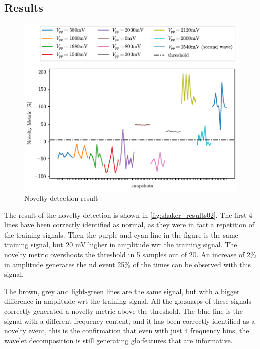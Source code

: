 \subsection{Results}
\begin{figure}
    \centering
    \includegraphics{Images/shaker/Test02.pdf}
    \caption{Novelty detection result}
    \label{fig:shaker_results02}
\end{figure}
The result of the novelty detection is shown in \autoref{fig:shaker_results02}. The first 4 lines have been correctly identified as normal, as they were in fact a repetition of the training signals.
Then the purple and cyan line in the figure is the same training signal, but 20 mV higher in amplitude \gls{wrt} the training signal. The novelty metric overshoots the threshold in 5 samples out of 20. An increase of 2\% in amplitude generates the \gls{nd} event 25\% of the times can be observed with this signal. 

The brown, grey and light-green lines are the same signal, but with a bigger difference in amplitude \gls{wrt} the training signal. All the \gls{glo:snap}s of these signals correctly generated a novelty metric above the threshold. The blue line is the signal with a different frequency content, and it has been correctly identified as a novelty event, this is the confirmation that even with just 4 frequency bins, the wavelet decomposition is still generating \gls{glo:feature}s that are informative.

